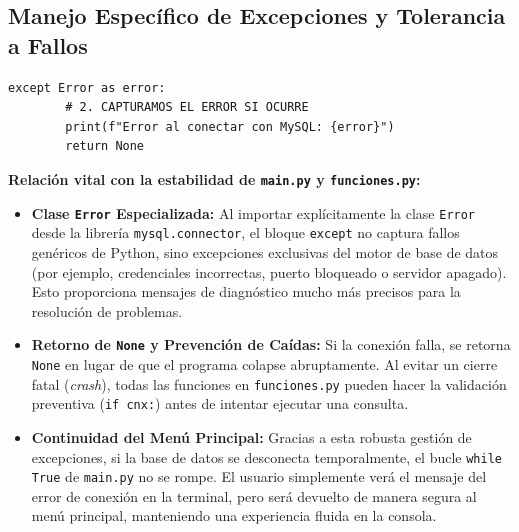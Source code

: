 \documentclass[11pt]{article}
\begin{document}
	\vspace{0.5cm}
	
	\subsection{Manejo Específico de Excepciones y Tolerancia a Fallos}
	\begin{lstlisting}[style=pythonstyle]
		except Error as error:
		# 2. CAPTURAMOS EL ERROR SI OCURRE
		print(f"Error al conectar con MySQL: {error}")
		return None
	\end{lstlisting}
	
	\noindent\textbf{Relación vital con la estabilidad de \texttt{main.py} y \texttt{funciones.py}:}
	\begin{itemize}[noitemsep,topsep=2pt]
		\item \textbf{Clase \texttt{Error} Especializada:} Al importar explícitamente la clase \texttt{Error} desde la librería \texttt{mysql.connector}, el bloque \texttt{except} no captura fallos genéricos de Python, sino excepciones exclusivas del motor de base de datos (por ejemplo, credenciales incorrectas, puerto bloqueado o servidor apagado). Esto proporciona mensajes de diagnóstico mucho más precisos para la resolución de problemas.
		\item \textbf{Retorno de \texttt{None} y Prevención de Caídas:} Si la conexión falla, se retorna \texttt{None} en lugar de que el programa colapse abruptamente. Al evitar un cierre fatal (\textit{crash}), todas las funciones en \texttt{funciones.py} pueden hacer la validación preventiva (\texttt{if cnx:}) antes de intentar ejecutar una consulta.
		\item \textbf{Continuidad del Menú Principal:} Gracias a esta robusta gestión de excepciones, si la base de datos se desconecta temporalmente, el bucle \texttt{while True} de \texttt{main.py} no se rompe. El usuario simplemente verá el mensaje del error de conexión en la terminal, pero será devuelto de manera segura al menú principal, manteniendo una experiencia fluida en la consola.
	\end{itemize}
	
\end{document}

